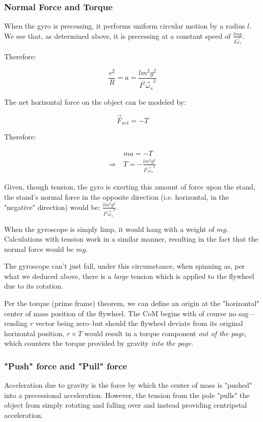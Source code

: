 \documentclass[letterpaper]{article}
\begin{document}
\subsubsection{Normal Force and Torque}
\label{sec:orga481750}
When the gyro is precessing, it performs uniform circular motion by a radius \(l\). We see that, as determined above, it is precessing at a constant speed of \(\frac{lmg}{I\vec{\omega}_s}\).

Therefore:

\begin{equation}
   \frac{v^2}{R} = a = \frac{lm^2g^2}{I^2{\vec{\omega}_s}^2}
\end{equation}

The net horizontal force on the object can be modeled by:

\begin{equation}
   \vec{F}_{net} = -T
\end{equation}

Therefore:

\begin{align}
   &ma = -T \\
\Rightarrow\ & T = -\frac{lm^3g^2}{I^2{\vec{\omega}_s}^2}
\end{align}

Given, though tension, the gyro is exerting this amount of force upon the stand, the stand's normal force in the opposite direction (i.e. horizontal, in the "negative" direction) would be: \(\frac{lm^3g^2}{I^2{\vec{\omega}_s}^2}\).

When the gyroscope is simply limp, it would hang with a weight of \(mg\). Calculations with tension work in a similar manner, resulting in the fact that the normal force would be \(mg\).

The gyroscope can't just fall, under this circumstance, when spinning as, per what we deduced above, there is a \emph{large} tension which is applied to the flywheel due to its rotation.

Per the torque (prime frame) theorem, we can define an origin at the "horizontal" center of mass position of the flywheel. The CoM begins with of course no sag---rending \(r\) vector being zero--but should the flywheel deviate from its original horizontal position, \(r\times T\) would result in a torque component \emph{out of the page}, which counters the torque provided by gravity \emph{into the page.}

\subsubsection{"Push" force and "Pull" force}
\label{sec:org77639da}
Acceleration due to gravity is the force by which the center of mass is "pushed" into a precessional acceleration. However, the tension from the pole "pulls" the object from simply rotating and falling over and instead providing centripetal acceleration.
\end{document}
